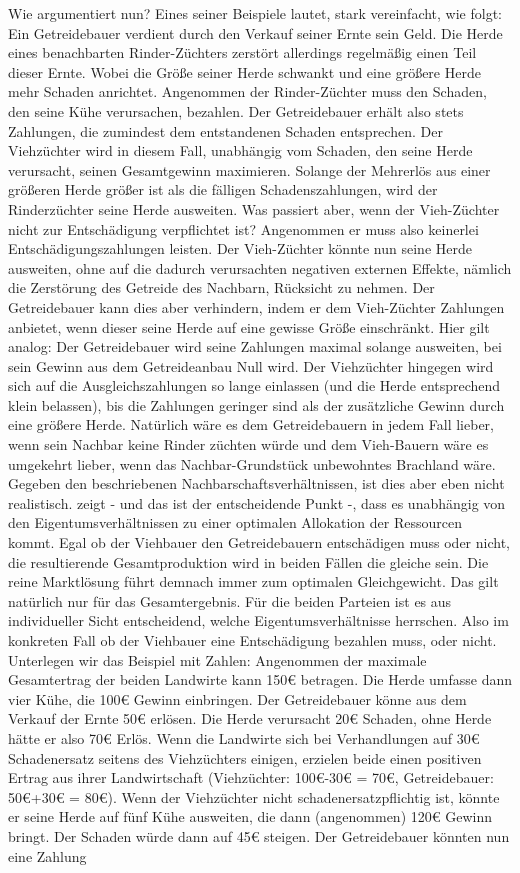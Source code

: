Wie argumentiert \textcite[S. 2ff]{Coase1960} nun? Eines seiner Beispiele lautet, stark vereinfacht, wie folgt: Ein Getreidebauer verdient durch den Verkauf seiner Ernte sein Geld. Die Herde eines benachbarten Rinder-Züchters zerstört allerdings regelmäßig einen Teil dieser Ernte. Wobei die Größe seiner Herde schwankt und eine größere Herde mehr Schaden anrichtet. Angenommen der Rinder-Züchter muss den Schaden, den seine Kühe verursachen, bezahlen. Der Getreidebauer erhält also stets Zahlungen, die zumindest dem entstandenen Schaden entsprechen. Der Viehzüchter wird in diesem Fall, unabhängig vom Schaden, den seine Herde verursacht, seinen Gesamtgewinn maximieren. Solange der Mehrerlös aus einer größeren Herde größer ist als die fälligen Schadenszahlungen, wird der Rinderzüchter seine Herde ausweiten. Was passiert aber, wenn der Vieh-Züchter nicht zur Entschädigung verpflichtet ist? Angenommen er muss also keinerlei Entschädigungszahlungen leisten. Der Vieh-Züchter könnte nun seine Herde ausweiten, ohne auf die dadurch verursachten negativen externen Effekte, nämlich die Zerstörung des Getreide des Nachbarn, Rücksicht zu nehmen. Der Getreidebauer kann dies aber verhindern, indem er dem Vieh-Züchter Zahlungen anbietet, wenn dieser seine Herde auf eine gewisse Größe einschränkt. Hier gilt analog: Der Getreidebauer wird seine Zahlungen maximal solange ausweiten, bei sein Gewinn aus dem Getreideanbau Null wird. Der Viehzüchter hingegen wird sich auf die Ausgleichszahlungen so lange einlassen (und die Herde entsprechend klein belassen), bis die Zahlungen geringer sind als der zusätzliche Gewinn durch eine größere Herde. Natürlich wäre es dem Getreidebauern in jedem Fall lieber, wenn sein Nachbar keine Rinder züchten würde und dem Vieh-Bauern wäre es umgekehrt lieber, wenn das Nachbar-Grundstück unbewohntes Brachland wäre. Gegeben den beschriebenen Nachbarschaftsverhältnissen, ist dies aber eben nicht realistisch. \textcite{Coase1960} zeigt - und das ist der entscheidende Punkt -, dass es unabhängig von den Eigentumsverhältnissen zu einer optimalen Allokation der Ressourcen kommt. Egal ob der Viehbauer den Getreidebauern entschädigen muss oder nicht, die resultierende Gesamtproduktion wird in beiden Fällen die gleiche sein. Die reine Marktlösung führt demnach immer zum optimalen Gleichgewicht. Das gilt natürlich nur für das Gesamtergebnis. Für die beiden Parteien ist es aus individueller Sicht entscheidend, welche Eigentumsverhältnisse herrschen. Also im konkreten Fall ob der Viehbauer eine Entschädigung bezahlen muss, oder nicht. Unterlegen wir das Beispiel mit Zahlen: Angenommen der maximale Gesamtertrag der beiden Landwirte kann 150€ betragen. Die Herde umfasse dann vier Kühe, die 100€ Gewinn einbringen. Der Getreidebauer könne aus dem Verkauf der Ernte 50€ erlösen. Die Herde verursacht 20€ Schaden, ohne Herde hätte er also 70€ Erlös. Wenn die Landwirte sich bei Verhandlungen auf 30€ Schadenersatz seitens des Viehzüchters einigen, erzielen beide einen positiven Ertrag aus ihrer Landwirtschaft (Viehzüchter: 100€-30€ = 70€, Getreidebauer: 50€+30€ = 80€). Wenn der Viehzüchter nicht schadenersatzpflichtig ist, könnte er seine Herde auf fünf Kühe ausweiten, die dann (angenommen) 120€ Gewinn bringt. Der Schaden würde dann auf 45€ steigen. Der Getreidebauer könnten nun eine Zahlung 